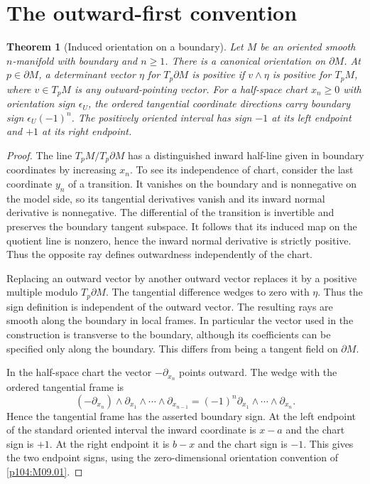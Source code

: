 \documentclass[11pt,oneside,openany]{book}
\newtheorem{theorem}{Theorem}[chapter]
\theoremstyle{definition}
\theoremstyle{remark}
\begin{document}
\section{The outward-first convention}

\begin{theorem}[Induced orientation on a boundary]
\label{p104:M09.03}
Let \(M\) be an oriented smooth \(n\)-manifold with boundary and \(n\geq1\). There is a canonical orientation on \(\partial M\). At \(p\in\partial M\), a determinant vector \(\eta\) for \(T_p\partial M\) is positive if \(v\wedge\eta\) is positive for \(T_pM\), where \(v\in T_pM\) is any outward-pointing vector. For a half-space chart \(x_n\geq0\) with orientation sign \(\epsilon_U\), the ordered tangential coordinate directions carry boundary sign \(\epsilon_U(-1)^n\). The positively oriented interval has sign \(-1\) at its left endpoint and \(+1\) at its right endpoint.
\end{theorem}

\begin{proof}
The line \(T_pM/T_p\partial M\) has a distinguished inward half-line given in boundary coordinates by increasing \(x_n\). To see its independence of chart, consider the last coordinate \(y_n\) of a transition. It vanishes on the boundary and is nonnegative on the model side, so its tangential derivatives vanish and its inward normal derivative is nonnegative. The differential of the transition is invertible and preserves the boundary tangent subspace. It follows that its induced map on the quotient line is nonzero, hence the inward normal derivative is strictly positive. Thus the opposite ray defines outwardness independently of the chart.

Replacing an outward vector by another outward vector replaces it by a positive multiple modulo \(T_p\partial M\). The tangential difference wedges to zero with \(\eta\). Thus the sign definition is independent of the outward vector. The resulting rays are smooth along the boundary in local frames. In particular the vector used in the construction is transverse to the boundary, although its coefficients can be specified only along the boundary. This differs from being a tangent field on \(\partial M\).

In the half-space chart the vector \(-\partial_{x_n}\) points outward. The wedge with the ordered tangential frame is
\[
 (-\partial_{x_n})\wedge\partial_{x_1}\wedge\cdots
 \wedge\partial_{x_{n-1}}
 =(-1)^n\partial_{x_1}\wedge\cdots\wedge\partial_{x_n}.
\]
Hence the tangential frame has the asserted boundary sign. At the left endpoint of the standard oriented interval the inward coordinate is \(x-a\) and the chart sign is \(+1\). At the right endpoint it is \(b-x\) and the chart sign is \(-1\). This gives the two endpoint signs, using the zero-dimensional orientation convention of \cref{p104:M09.01}.
\end{proof}
\end{document}
